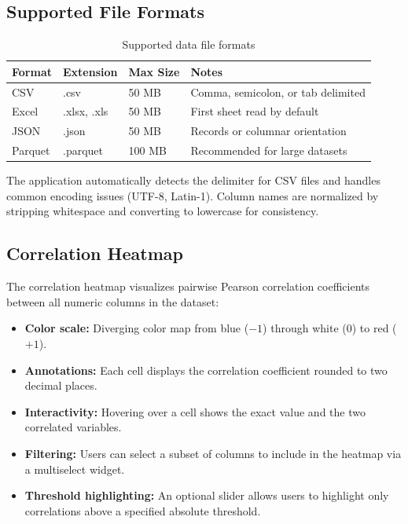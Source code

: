 \subsection{Supported File Formats}

\begin{table}[htbp]
\centering
\caption{Supported data file formats}
\label{tab:file-formats}
\begin{tabular}{|l|l|l|l|}
\hline
\textbf{Format} & \textbf{Extension} & \textbf{Max Size} & \textbf{Notes} \\
\hline
CSV & .csv & 50 MB & Comma, semicolon, or tab delimited \\
\hline
Excel & .xlsx, .xls & 50 MB & First sheet read by default \\
\hline
JSON & .json & 50 MB & Records or columnar orientation \\
\hline
Parquet & .parquet & 100 MB & Recommended for large datasets \\
\hline
\end{tabular}
\end{table}

\noindent The application automatically detects the delimiter for CSV files and handles common encoding issues (UTF-8, Latin-1). Column names are normalized by stripping whitespace and converting to lowercase for consistency.

\subsection{Correlation Heatmap}

The correlation heatmap visualizes pairwise Pearson correlation coefficients between all numeric columns in the dataset:

\begin{itemize}
    \item \textbf{Color scale:} Diverging color map from blue ($-1$) through white ($0$) to red ($+1$).
    \item \textbf{Annotations:} Each cell displays the correlation coefficient rounded to two decimal places.
    \item \textbf{Interactivity:} Hovering over a cell shows the exact value and the two correlated variables.
    \item \textbf{Filtering:} Users can select a subset of columns to include in the heatmap via a multiselect widget.
    \item \textbf{Threshold highlighting:} An optional slider allows users to highlight only correlations above a specified absolute threshold.
\end{itemize}

